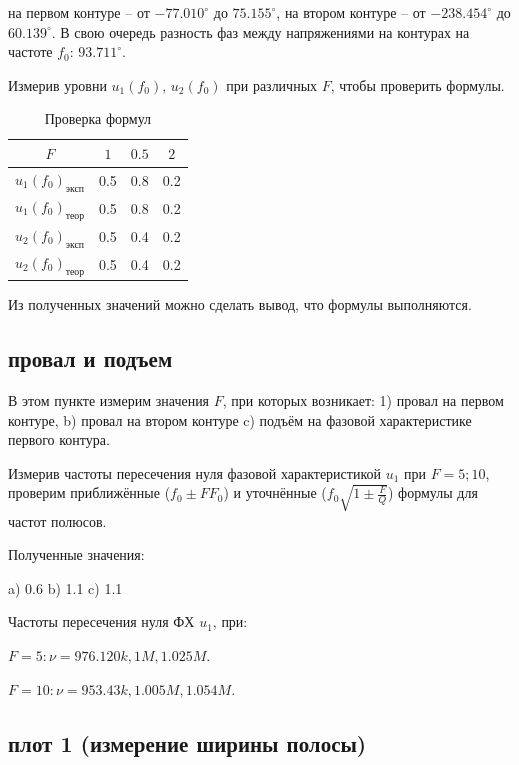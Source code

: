\documentclass[a4paper, 14pt]{extarticle}%
\begin{document}
\newpage

на первом контуре -- от $-77.010^{\circ}$ до $75.155^{\circ}$, на втором контуре -- от $-238.454^{\circ}$ до $60.139^{\circ}$. В свою очередь разность фаз между напряжениями на контурах на частоте $f_0$: $93.711^{\circ}$.

Измерив уровни $u_1(f_0)$, $u_2(f_0)$ при различных $F$, чтобы проверить формулы.
 

\begin{table}[h]
	\centering
	\begin{tabular}{|c|c|c|c|}
		\hline
		$F$                         & $1$ & $0.5$ & $2$ \\ \hline
		$u_1(f_0)_{\text{эксп}}$          & 0.5 & 0.8   & 0.2 \\ \hline
		$u_1(f_0)_{\text{теор}}$ & 0.5 & 0.8   & 0.2 \\ \hline \hline
		$u_2(f_0)_{\text{эксп}}$          & 0.5 & 0.4   & 0.2 \\ \hline
		$u_2(f_0)_{\text{теор}}$ & 0.5 & 0.4   & 0.2 \\ \hline
	\end{tabular}
	\caption{Проверка формул}
\end{table}

Из полученных значений можно сделать вывод, что формулы выполняются.


\subsection{провал и подъем}

В этом пункте измерим значения $F$, при которых возникает: 1) провал на первом контуре, b) провал на втором контуре c) подъём на фазовой характеристике первого контура.

Измерив частоты пересечения нуля фазовой характеристикой $u_1$ при $F = 5;10$, проверим приближённые ($f_0\pm FF_0$) и уточнённые ($f_0\sqrt{1\pm\frac{F}{Q}}$) формулы для частот полюсов.

Полученные значения:

a) 0.6
b) 1.1
c) 1.1

Частоты пересечения нуля ФХ $u_1$, при:

$F = 5: \nu = 976.120k, 1M, 1.025M$.

$F = 10: \nu = 953.43k, 1.005M, 1.054M$. 

\subsection{плот 1 (измерение ширины полосы)}
\end{document}
